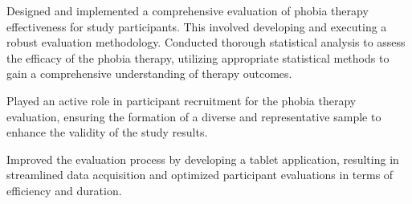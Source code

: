 \documentclass[]{plushcv}
\begin{document}
\begin{minipage}[t]{0.70\textwidth}
\begin{tightemize}
\end{tightemize}
\sectionsep
\sectionsep

\begin{tightemize}
\sectionsep
\item Designed and implemented a comprehensive evaluation of phobia therapy effectiveness for study participants. This involved developing and executing a robust evaluation methodology.
Conducted thorough statistical analysis to assess the efficacy of the phobia therapy, utilizing appropriate statistical methods to gain a comprehensive understanding of therapy outcomes.
\item Played an active role in participant recruitment for the phobia therapy evaluation, ensuring the formation of a diverse and representative sample to enhance the validity of the study results.
\item Improved the evaluation process by developing a tablet application, resulting in streamlined data acquisition and optimized participant evaluations in terms of efficiency and duration.
\end{tightemize}
\sectionsep

%
%

\end{minipage} 
\hfill
\end{document}
